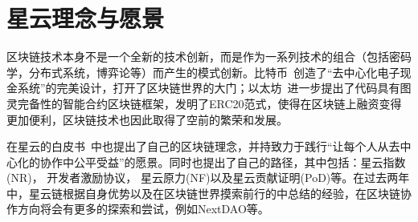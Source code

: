 \section{星云理念与愿景}
区块链技术本身不是一个全新的技术创新，而是作为一系列技术的组合（包括密码学，分布式系统，博弈论等）而产生的模式创新。比特币~\cite{Nakamoto2008}创造了“去中⼼化电⼦现⾦系统”的完美设计，打开了区块链世界的大门；以太坊~\cite{buterin2013ethereum}进一步提出了代码具有图灵完备性的智能合约区块链框架，发明了ERC20范式，使得在区块链上融资变得更加便利，区块链技术也因此取得了空前的繁荣和发展。

在星云的白皮书~\cite{TechWhitepaper}中也提出了自己的区块链理念，并持致力于践行“让每个人从去中心化的协作中公平受益”的愿景。同时也提出了自己的路径，其中包括：星云指数(NR)， 开发者激励协议， 星云原力(NF)以及星云贡献证明(PoD)等。在过去两年中，星云链根据自身优势以及在区块链世界摸索前行的中总结的经验，在区块链协作方向将会有更多的探索和尝试，例如NextDAO等。
